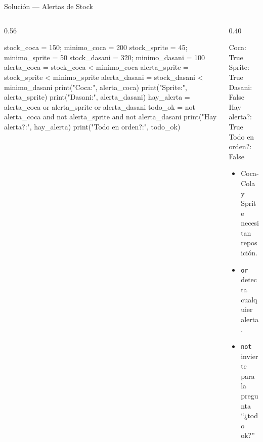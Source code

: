 \documentclass[aspectratio=169, 11pt]{beamer}
\begin{document}
\begin{frame}[fragile,shrink=30]{Solución --- Alertas de Stock}
  \vspace{-6pt}
  \begin{columns}[T]
    \begin{column}{0.56\textwidth}
      \begin{pyblock}
stock_coca  = 150; minimo_coca  = 200
stock_sprite = 45; minimo_sprite = 50
stock_dasani = 320; minimo_dasani = 100
alerta_coca   = stock_coca < minimo_coca
alerta_sprite = stock_sprite < minimo_sprite
alerta_dasani = stock_dasani < minimo_dasani
print("Coca:", alerta_coca)
print("Sprite:", alerta_sprite)
print("Dasani:", alerta_dasani)
hay_alerta = alerta_coca or alerta_sprite or alerta_dasani
todo_ok = not alerta_coca and not alerta_sprite and not alerta_dasani
print("Hay alerta?:", hay_alerta)
print("Todo en orden?:", todo_ok)
      \end{pyblock}
    \end{column}

    \begin{column}{0.40\textwidth}
      \vspace{4pt}
      \begin{outputblock}
Coca: True
Sprite: True
Dasani: False
Hay alerta?: True
Todo en orden?: False
      \end{outputblock}

      \vspace{6pt}
      {\footnotesize\color{textMuted}
      \begin{itemize}\setlength{\itemsep}{4pt}
        \item[{\color{arcaRed}\scriptsize\faCheck}]
          Coca-Cola y Sprite necesitan reposición.
        \item[{\color{arcaRed}\scriptsize\faCheck}]
          \texttt{or} detecta cualquier alerta.
        \item[{\color{arcaRed}\scriptsize\faCheck}]
          \texttt{not} invierte para la pregunta ``¿todo ok?''
      \end{itemize}
      }
    \end{column}
  \end{columns}
\end{frame}
\end{document}
